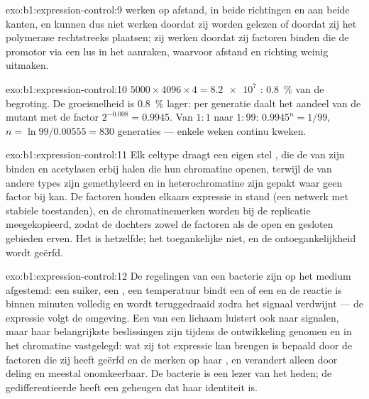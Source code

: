 \begin{solution}{exo:b1:expression-control:9}
 werken op afstand, in beide richtingen en aan beide kanten, en kunnen dus
niet werken doordat zij worden gelezen of doordat zij het polymerase rechtstreeks
plaatsen; zij werken doordat zij factoren binden die de promotor via een lus in het
 aanraken, waarvoor afstand en richting weinig uitmaken.
\end{solution}

\begin{solution}{exo:b1:expression-control:10}
$5000\times 4096\times 4 = \num{8.2e7}$ : \qty{0.8}{\%} van de begroting. De
groeisnelheid is \qty{0.8}{\%} lager: per generatie daalt het aandeel van de mutant
met de factor $2^{-0.008} = 0.9945$. Van $1:1$ naar $1:99$: $0.9945^n = 1/99$,
$n = \ln 99/0.00555 = 830$ generaties --- enkele weken continu kweken.
\end{solution}

\begin{solution}{exo:b1:expression-control:11}
Elk celtype draagt een eigen stel , die de  van zijn
 binden en acetylasen erbij halen die hun chromatine openen, terwijl de 
van andere types zijn gemethyleerd en in heterochromatine zijn gepakt waar geen
factor bij kan. De factoren houden elkaars expressie in stand (een netwerk met
stabiele toestanden), en de chromatinemerken worden bij de replicatie meegekopieerd,
zodat de dochters zowel de factoren als de open en gesloten gebieden erven. Het
 is hetzelfde; het toegankelijke  niet, en de ontoegankelijkheid wordt
geërfd.
\end{solution}

\begin{solution}{exo:b1:expression-control:12}
De regelingen van een bacterie zijn op het medium afgestemd: een suiker, een
, een temperatuur bindt een  of een  en de reactie is
binnen minuten volledig en wordt teruggedraaid zodra het signaal verdwijnt --- de
expressie volgt de omgeving. Een  van een lichaam luistert ook naar signalen,
maar haar belangrijkste beslissingen zijn tijdens de ontwikkeling genomen en in het
chromatine vastgelegd: wat zij tot expressie kan brengen is bepaald door de
factoren die zij heeft geërfd en de merken op haar , en verandert alleen door
deling en meestal onomkeerbaar. De bacterie is een lezer van het heden; de
gedifferentieerde  heeft een geheugen dat haar identiteit is.
\end{solution}


